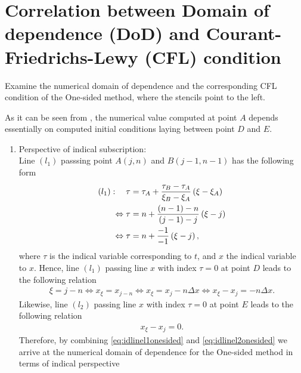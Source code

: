 \documentclass[12pt]{article}
\begin{document}
\section{Correlation between Domain of dependence (DoD) and Courant-Friedrichs-Lewy (CFL) condition}
\begin{example}\label{eq:example1}
	Examine the numerical domain of dependence 
	and the corresponding CFL condition of the One-sided method,
	where the stencils point to the left.
\end{example}
As it can be seen from , 
the numerical value computed at point $A$ depends essentially on 
computed initial conditions laying between point $D$ and $E$.
\begin{enumerate}
	\item Perspective of indical subscription:\\
	      Line $(l_1)$ passsing point $A(j,n)$ and $B(j-1,n-1)$
	      has the following form
	      \begin{align}
		      (l_1):\quad 
		      \tau & = \tau_A + \frac{\tau_B-\tau_A}{\xi_B-\xi_A}\left(\xi-\xi_A\right) \notag \\
		      \Leftrightarrow
		      \tau & = n + \frac{(n-1)-n}{(j-1)-j} \left(\xi-j\right) \notag                   \\
		      \Leftrightarrow
		      \tau & = n + \frac{-1}{-1} \left(\xi-j\right),
	      \end{align}
	      where $\tau$ is the indical variable corresponding to $t$,
	      and $x$ the indical variable to $x$.
	      Hence, line $(l_1)$ passing line $x$ with index $\tau=0$ at point $D$ leads 
	      to the following relation
	      \begin{align}\label{eq:idlinel1onesided}
		      \xi = j - n
		      \Leftrightarrow 
		      x_{\xi} = x_{j-n}
		      \Leftrightarrow 
		      x_{\xi} = x_{j}-n\Delta x
		      \Leftrightarrow 
		      x_{\xi} - x_j =-n\Delta x.
	      \end{align}
	      Likewise, line $(l_2)$ passing line $x$ with index $\tau=0$ at point $E$
	      leads to the following relation
	      \begin{align}\label{eq:idlinel2onesided}
		      x_{\xi} - x_{j} = 0.
	      \end{align}
	      Therefore, by combining \eqref{eq:idlinel1onesided}
	      and \eqref{eq:idlinel2onesided} we arrive at the numerical domain of dependence
	      for the One-sided method in terms of indical perspective

\end{enumerate}
\end{document}
